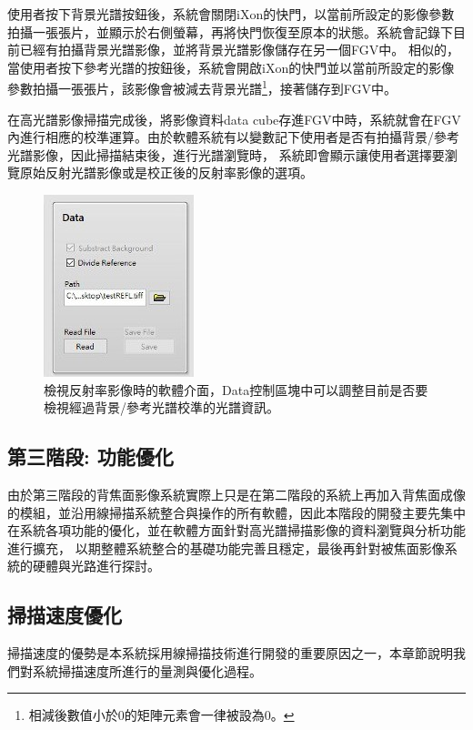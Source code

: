 \documentclass[12pt]{article}
\begin{document}
使用者按下背景光譜按鈕後，系統會關閉iXon的快門，以當前所設定的影像參數拍攝一張張片，並顯示於右側螢幕，再將快門恢復至原本的狀態。系統會記錄下目前已經有拍攝背景光譜影像，並將背景光譜影像儲存在另一個FGV中。
相似的，當使用者按下參考光譜的按鈕後，系統會開啟iXon的快門並以當前所設定的影像參數拍攝一張張片，該影像會被減去背景光譜\footnote{相減後數值小於0的矩陣元素會一律被設為0。}，接著儲存到FGV中。

在高光譜影像掃描完成後，將影像資料data cube存進FGV中時，系統就會在FGV內進行相應的校準運算。由於軟體系統有以變數記下使用者是否有拍攝背景/參考光譜影像，因此掃描結束後，進行光譜瀏覽時，
系統即會顯示讓使用者選擇要瀏覽原始反射光譜影像或是校正後的反射率影像的選項。
\begin{figure}[ht]
    \centering
    \includegraphics[width=0.3\linewidth]{reflection.jpeg}
    \caption[檢視反射率影像時的軟體介面。]{檢視反射率影像時的軟體介面，Data控制區塊中可以調整目前是否要檢視經過背景/參考光譜校準的光譜資訊。}
    \label{figure: reflection}
\end{figure}

\subsection{第三階段: 功能優化}
由於第三階段的背焦面影像系統實際上只是在第二階段的系統上再加入背焦面成像的模組，並沿用線掃描系統整合與操作的所有軟體，因此本階段的開發主要先集中在系統各項功能的優化，並在軟體方面針對高光譜掃描影像的資料瀏覽與分析功能進行擴充，
以期整體系統整合的基礎功能完善且穩定，最後再針對被焦面影像系統的硬體與光路進行探討。

\subsection{掃描速度優化}
掃描速度的優勢是本系統採用線掃描技術進行開發的重要原因之一，本章節說明我們對系統掃描速度所進行的量測與優化過程。
\end{document}
